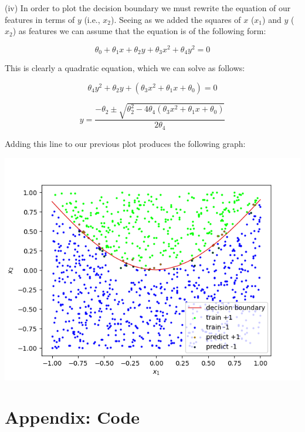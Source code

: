 \documentclass[12pt]{article}
\begin{document}
\noindent (iv) In order to plot the decision boundary we must rewrite the equation of our features in terms of $y$ (i.e., $x_2$). Seeing as we added the squares of $x$ ($x_1$) and $y$ ($x_2$) as features we can assume that the equation is of the following form:

$$\theta_0 + \theta_1x + \theta_2y + \theta_3x^2 + \theta_4y^2 = 0$$

This is clearly a quadratic equation, which we can solve as follows:

$$\theta_4y^2 + \theta_2y + (\theta_3x^2 + \theta_1x + \theta_0) = 0$$

$$y = \frac{-\theta_2 \pm \sqrt{\theta_2^2 - 4\theta_4(\theta_3x^2 + \theta_1x + \theta_0)}}{2\theta_4}$$

Adding this line to our previous plot produces the following graph:

\begin{center}
    \includegraphics[scale=0.8]{fig_7.png}
\end{center}

\section*{Appendix: Code}
\end{document}

